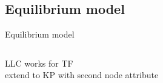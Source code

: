 \subsection{Equilibrium model}
\begin{frame}{Equilibrium model}
\label{sec:equilibrium_model}

\begin{columns}
\begin{column}{0.5\textwidth}

LLC works for TF\\
extend to KP with second node attribute






\end{column}
\end{columns}
\end{frame}

